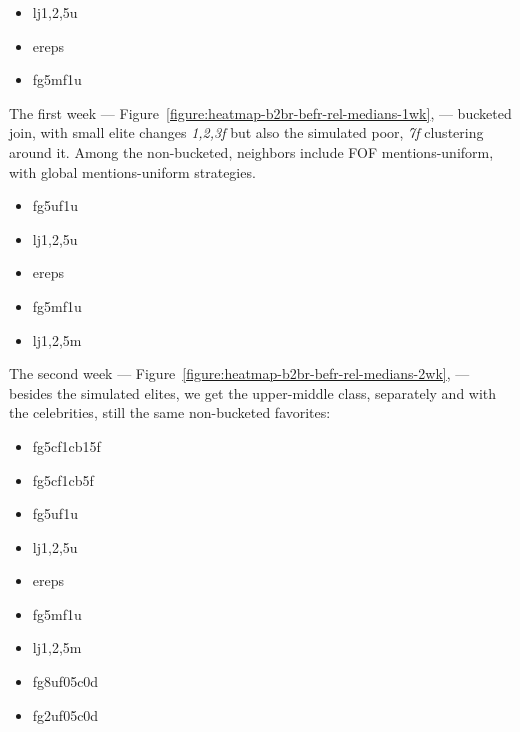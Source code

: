 \documentclass[10pt,oneside]{memoir}
\begin{document}
\begin{Spacing}{2}
\begin{itemize}
\item lj{1,2,5}u

\item ereps

\item fg5mf1u
\end{itemize}

The first week --- Figure~\ref{figure:heatmap-b2br-befr-rel-medians-1wk}, ---  bucketed join, with small elite changes {\itshape {1,2,3}f} but also the simulated poor, {\itshape 7f} clustering around it.  Among the non-bucketed, neighbors include FOF mentions-uniform, with global mentions-uniform strategies.


\begin{itemize}


\item fg5uf1u

\item lj{1,2,5}u

\item ereps

\item fg5mf1u

\item lj{1,2,5}m
\end{itemize}

The second week --- Figure~\ref{figure:heatmap-b2br-befr-rel-medians-2wk}, ---  besides the simulated elites, we get the upper-middle class, separately and with the celebrities, still the same non-bucketed favorites:


\begin{itemize}


\item fg5cf1cb15f

\item fg5cf1cb5f

\item fg5uf1u

\item lj{1,2,5}u

\item ereps

\item fg5mf1u

\item lj{1,2,5}m

\item fg8uf05c0d

\item fg2uf05c0d
\end{itemize}


\end{Spacing}
\end{document}
